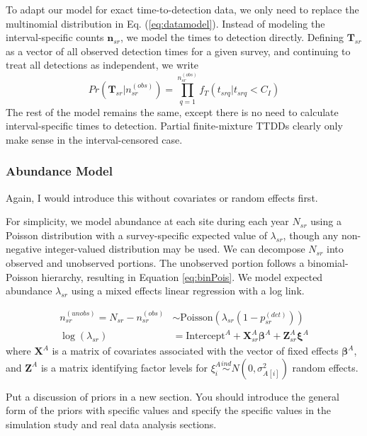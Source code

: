 \documentclass[useAMS,usenatbib,referee,12pt]{article}
\newcommand{\jarad}[1]{{\color{red} #1}}
\newcommand{\vn}{\textbf{n}}
\begin{document}
To adapt our model for exact time-to-detection data, we only need to replace the multinomial distribution in Eq. (\ref{eq:datamodel}).  Instead of modeling the interval-specific counts $\vn_{sr}$, we model the times to detection directly.  Defining $\textbf{T}_{sr}$ as a vector of all observed detection times for a given survey, and continuing to treat all detections as independent, we write
\[
Pr\left(\textbf{T}_{sr}|n_{sr}^{(obs)}\right) = \prod\limits_{q=1}^{n_{sr}^{(obs)}} f_T(t_{srq}|t_{srq}<C_I)
\]
The rest of the model remains the same, except there is no need to calculate interval-specific times to detection.  Partial finite-mixture TTDDs clearly only make sense in the interval-censored case.




\subsubsection{Abundance Model}

\jarad{Again, I would introduce this without covariates or random effects first.}

For simplicity, we model abundance at each site during each year $N_{sr}$ using a Poisson distribution with a survey-specific expected value of $\lambda_{sr}$, though any non-negative integer-valued distribution may be used.  We can decompose $N_{sr}$ into observed and unobserved portions.  The unobserved portion follows a binomial-Poisson hierarchy, resulting in Equation \ref{eq:binPois}.  We model expected abundance $\lambda_{sr}$ using a mixed effects linear regression with a log link.

\begin{align}
\label{eq:binPois} n_{sr}^{(unobs)} = N_{sr} - n_{sr}^{(obs)} &\sim \mbox{Poisson}\left(\lambda_{sr}(1-p_{sr}^{(det)})\right)\\
\log (\lambda_{sr}) &= \text{Intercept}^A + \textbf{X}_{sr}^A\boldsymbol{\beta}^A + \textbf{Z}_{sr}^A\boldsymbol{\xi}^A
\end{align}
where $\textbf{X}^A$ is a matrix of covariates associated with the vector of fixed effects $\boldsymbol{\beta}^A$, and $\textbf{Z}^A$ is a matrix identifying factor levels for $\xi_i^A \overset{ind}{\sim} N(0,\sigma_{A[i]}^2)$ random effects. 

\jarad{Put a discussion of priors in a new section. You should introduce the general form of the priors with specific values and specify the specific values in the simulation study and real data analysis sections.}
\end{document}
